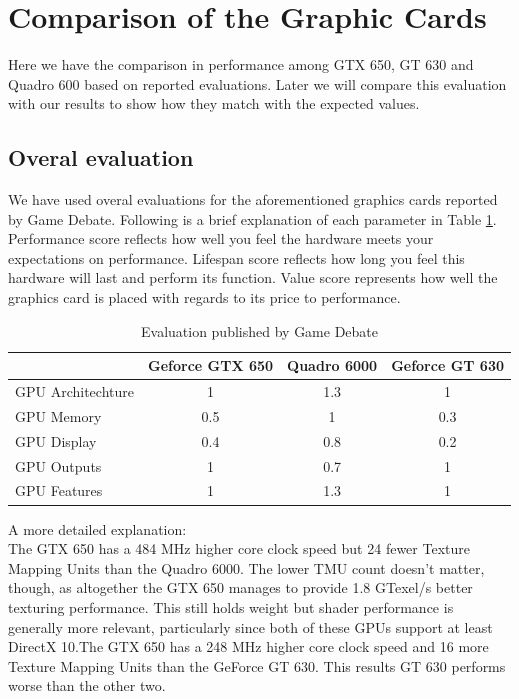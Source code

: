 \documentclass[paper=a4, fontsize=11pt]{scrartcl}
\numberwithin{equation}{section}		%
\numberwithin{figure}{section}			%
\numberwithin{table}{section}				%
\begin{document}
\section{Comparison of the Graphic Cards}
Here we have the comparison in performance among GTX 650, GT 630 and Quadro 600 based on reported evaluations. Later we will compare this evaluation with our results to show how they match with the expected values. 

\subsection{Overal evaluation}
We have used overal evaluations for the aforementioned graphics cards reported by Game Debate. Following is a brief explanation of each parameter in Table \ref{GPU comparison}. Performance score reflects how well you feel the hardware meets your expectations on performance. Lifespan score reflects how long you feel this hardware will last and perform its function. Value score represents how well the graphics card is placed with regards to its price to performance. 

\begin{table}[!h]
\caption{Evaluation published by Game Debate}
\centering
\begin{tabular}{|l|c|c|c|}
	\hline
	 & Geforce GTX 650 & Quadro 6000 & Geforce GT 630\\
	\hline
      	GPU Architechture & 1 & 1.3 & 1 \\
	\hline
    	GPU Memory & 0.5 & 1 & 0.3 \\
	\hline
    	GPU Display & 0.4 & 0.8 & 0.2\\
	\hline
	GPU Outputs & 1 & 0.7 & 1 \\
	\hline
	GPU Features & 1 & 1.3 & 1 \\
	\hline

\end{tabular}
\label{GPU comparison}
\end{table}

A more detailed explanation:\\
The GTX 650 has a 484 MHz higher core clock speed but 24 fewer Texture Mapping Units than the Quadro 6000. The lower TMU count doesn't matter, though, as altogether the GTX 650 manages to provide 1.8 GTexel/s better texturing performance. This still holds weight but shader performance is generally more relevant, particularly since both of these GPUs support at least DirectX 10.The GTX 650 has a 248 MHz higher core clock speed and 16 more Texture Mapping Units than the GeForce GT 630. This results GT 630 performs worse than the other two.
\end{document}
